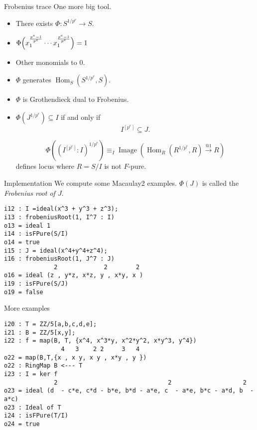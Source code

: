 \documentclass[xcolor=dvipsnames]{beamer}
\newcommand{\memph}[1]{{\color{Red}\emph{#1}}}
\DeclareMathOperator{\Hom}{Hom}
\DeclareMathOperator{\Image}{{Image}}
\theoremstyle{remark}
\begin{document}
\begin{frame}[c]{Frobenius trace}
  One more big tool.
  \begin{itemize}
    \item<2->  There exists $\Phi : S^{1/p^e} \to S$.
    \item<3->  $\Phi\Big(x_1^{p^e - 1 \over p^e} \cdots x_1^{p^e - 1 \over p^e}\Big) = 1$
    \item<4->  Other monomials to 0.
    \item<5->  $\Phi$ generates $\Hom_S(S^{1/p^e}, S)$.
    \item<6->  $\Phi$ is Grothendieck dual to Frobenius.
    \item<7->  $\Phi(J^{1/p^e}) \subseteq I$ if and only if
    \[
      I^{[p^e]} \subseteq J.
    \]
    \begin{theorem}
      \[
      \Phi((I^{[p^e]} : I)^{1/p^e}) \equiv_I \Image(\Hom_R(R^{1/p^e}, R) \xrightarrow{@1} R)
      \] 
      defines locus where $R = S/I$ is not $F$-pure.
    \end{theorem}
  \end{itemize}
\end{frame}

\begin{frame}[fragile]{Implementation}
  We compute some Macaulay2 examples.  $\Phi(J)$ is called the \memph{Frobenius root of $J$}.
  \begin{verbatim}
i12 : I =ideal(x^3 + y^3 + z^3);
i13 : frobeniusRoot(1, I^7 : I)
o13 = ideal 1
i14 : isFPure(S/I)
o14 = true
i15 : J = ideal(x^4+y^4+z^4);
i16 : frobeniusRoot(1, J^7 : J)
              2             2        2
o16 = ideal (z , y*z, x*z, y , x*y, x )
i19 : isFPure(S/J)
o19 = false
  \end{verbatim}
\end{frame}

\begin{frame}[fragile]{More examples}
  \begin{verbatim}
i20 : T = ZZ/5[a,b,c,d,e];
i21 : B = ZZ/5[x,y];
i22 : f = map(B, T, {x^4, x^3*y, x^2*y^2, x*y^3, y^4})
                4   3    2 2     3   4
o22 = map(B,T,{x , x y, x y , x*y , y })
o22 : RingMap B <--- T
i23 : I = ker f
              2                               2                    2
o23 = ideal (d  - c*e, c*d - b*e, b*d - a*e, c  - a*e, b*c - a*d, b  - a*c)
o23 : Ideal of T
i24 : isFPure(T/I)
o24 = true
  \end{verbatim}
\end{frame}
\end{document}
